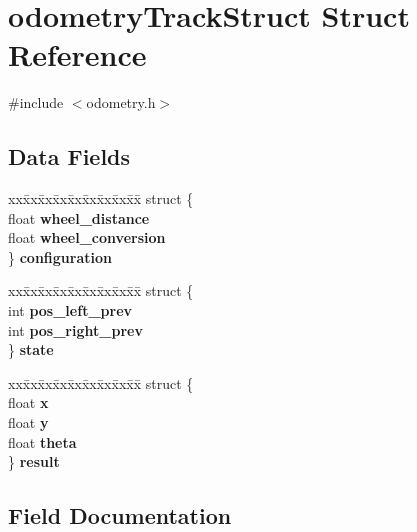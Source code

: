 \section{odometry\-Track\-Struct Struct Reference}
\label{structodometry_track_struct}


{\ttfamily \#include $<$odometry.\-h$>$}

\subsection*{Data Fields}
\begin{DoxyCompactItemize}
\item 
\begin{tabbing}
xx\=xx\=xx\=xx\=xx\=xx\=xx\=xx\=xx\=\kill
struct \{\\
\>float {\bf wheel\_distance}\\
\>float {\bf wheel\_conversion}\\
\} {\bf configuration}\\

\end{tabbing}\item 
\begin{tabbing}
xx\=xx\=xx\=xx\=xx\=xx\=xx\=xx\=xx\=\kill
struct \{\\
\>int {\bf pos\_left\_prev}\\
\>int {\bf pos\_right\_prev}\\
\} {\bf state}\\

\end{tabbing}\item 
\begin{tabbing}
xx\=xx\=xx\=xx\=xx\=xx\=xx\=xx\=xx\=\kill
struct \{\\
\>float {\bf x}\\
\>float {\bf y}\\
\>float {\bf theta}\\
\} {\bf result}\\

\end{tabbing}\end{DoxyCompactItemize}


\subsection{Field Documentation}
